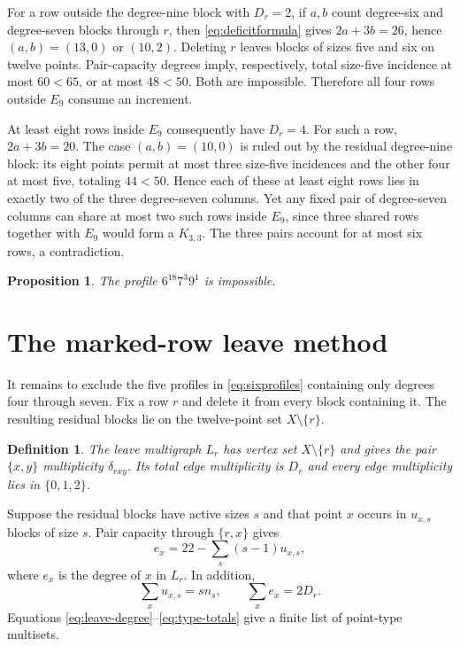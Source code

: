 \documentclass[11pt]{amsart}
\newtheorem{proposition}[theorem]{Proposition}
\newtheorem{definition}[theorem]{Definition}
\begin{document}
For a row outside the degree-nine block with $D_r=2$, if $a,b$ count degree-six and degree-seven blocks through $r$, then \eqref{eq:deficitformula} gives $2a+3b=26$, hence $(a,b)=(13,0)$ or $(10,2)$. Deleting $r$ leaves blocks of sizes five and six on twelve points. Pair-capacity degrees imply, respectively, total size-five incidence at most $60<65$, or at most $48<50$. Both are impossible. Therefore all four rows outside $E_9$ consume an increment.

At least eight rows inside $E_9$ consequently have $D_r=4$. For such a row, $2a+3b=20$. The case $(a,b)=(10,0)$ is ruled out by the residual degree-nine block: its eight points permit at most three size-five incidences and the other four at most five, totaling $44<50$. Hence each of these at least eight rows lies in exactly two of the three degree-seven columns. Yet any fixed pair of degree-seven columns can share at most two such rows inside $E_9$, since three shared rows together with $E_9$ would form a $K_{3,3}$. The three pairs account for at most six rows, a contradiction.

\begin{proposition}\label{prop:nine}
The profile $6^{18}7^3 9^1$ is impossible.
\end{proposition}

\section{The marked-row leave method}
It remains to exclude the five profiles in \eqref{eq:sixprofiles} containing only degrees four through seven. Fix a row $r$ and delete it from every block containing it. The resulting residual blocks lie on the twelve-point set $X\setminus\{r\}$.

\begin{definition}
The \emph{leave multigraph} $L_r$ has vertex set $X\setminus\{r\}$ and gives the pair $\{x,y\}$ multiplicity $\delta_{rxy}$. Its total edge multiplicity is $D_r$ and every edge multiplicity lies in $\{0,1,2\}$.
\end{definition}

Suppose the residual blocks have active sizes $s$ and that point $x$ occurs in $u_{x,s}$ blocks of size $s$. Pair capacity through $\{r,x\}$ gives
\begin{equation}\label{eq:leave-degree}
 e_x=22-\sum_s(s-1)u_{x,s},
\end{equation}
where $e_x$ is the degree of $x$ in $L_r$. In addition,
\begin{equation}\label{eq:type-totals}
 \sum_xu_{x,s}=s n_s,
 \qquad
 \sum_xe_x=2D_r.
\end{equation}
Equations \eqref{eq:leave-degree}--\eqref{eq:type-totals} give a finite list of point-type multisets.
\end{document}
